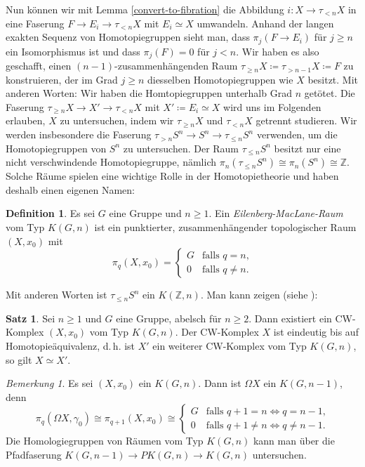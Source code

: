 \documentclass[11pt, a4paper, german]{article}
\theoremstyle{definition}
\newtheorem{satz}[lem]{Satz}
\newtheorem{defn}[lem]{Definition}
\theoremstyle{remark}
\newtheorem*{bem}{Bemerkung}
\newcommand{\Z}{\mathbb{Z}} %
\newcommand{\trunc}[2]{\tau_{#1} #2} %
\renewcommand{\dh}{d.\,h.} %
\begin{document}
Nun können wir mit Lemma \ref{convert-to-fibration} die Abbildung $i : X \to \trunc{< n}{X}$ in eine Faserung $F \to E_i \to \trunc{< n}{X}$ mit $E_i \simeq X$ umwandeln.
Anhand der langen exakten Sequenz von Homotopiegruppen sieht man, dass $\pi_j(F \to E_i)$ für $j \geq n$ ein Isomorphismus ist und dass $\pi_j(F) = 0$ für $j < n$.
Wir haben es also geschafft, einen $(n{-}1)$-zusammenhängenden Raum $\trunc{\geq n}{X} \coloneqq \trunc{> n-1}{X} \coloneqq F$ zu konstruieren, der im Grad $j \geq n$ diesselben Homotopiegruppen wie $X$ besitzt.
Mit anderen Worten: Wir haben die Homtopiegruppen unterhalb Grad $n$ getötet.
Die Faserung $\trunc{\geq n}{X} \to X' \to \trunc{< n}{X}$ mit $X' \coloneqq E_i \simeq X$ wird uns im Folgenden erlauben, $X$ zu untersuchen, indem wir $\trunc{\geq n}{X}$ und $\trunc{< n}{X}$ getrennt studieren.
Wir werden insbesondere die Faserung $\trunc{> n}{S^n} \to S^n \to \trunc{\leq n}{S^n}$ verwenden, um die Homotopiegruppen von $S^n$ zu untersuchen.
Der Raum $\trunc{\leq n}{S^n}$ besitzt nur eine nicht verschwindende Homotopiegruppe, nämlich $\pi_n(\trunc{\leq n}{S^n}) \cong \pi_n(S^n) \cong \Z$.
Solche Räume spielen eine wichtige Rolle in der Homotopietheorie und haben deshalb einen eigenen Namen:

\begin{defn}
  Es sei $G$ eine Gruppe und $n \geq 1$.
  Ein \emph{Eilenberg-MacLane-Raum} vom Typ $K(G, n)$ ist ein punktierter, zusammenhängender topologischer Raum $(X, x_0)$ mit
  \[
    \pi_q(X, x_0) = \begin{cases}
      G & \text{falls $q = n$,} \\
      0 & \text{falls $q \neq n$.}
    \end{cases}
  \]
\end{defn}

Mit anderen Worten ist $\trunc{\leq n}{S^n}$ ein $K(\Z, n)$.
Man kann zeigen (siehe \cite[365-366]{hatcher:at}):

\begin{satz}
  Sei $n \geq 1$ und $G$ eine Gruppe, abelsch für $n \geq 2$.
  Dann existiert ein CW-Komplex $(X, x_0)$ vom Typ $K(G, n)$.
  Der CW-Komplex $X$ ist eindeutig bis auf Homotopieäquivalenz, \dh{} ist $X'$ ein weiterer CW-Komplex vom Typ $K(G, n)$, so gilt $X \simeq X'$.
\end{satz}

\begin{bem}
  Es sei $(X, x_0)$ ein $K(G, n)$. Dann ist $\Omega X$ ein $K(G, n-1)$, denn
  \[
    \pi_q(\Omega X, \gamma_0) \cong
    \pi_{q+1}(X, x_0) \cong
    \begin{cases}
      G & \text{falls $q+1 = n \iff q = n-1$,} \\
      0 & \text{falls $q+1 \neq n \iff q \neq n-1$.}
    \end{cases}
  \]
  Die Homologiegruppen von Räumen vom Typ $K(G, n)$ kann man über die Pfadfaserung $K(G, n{-}1) \to P K(G, n) \to K(G, n)$ untersuchen.
\end{bem}
\end{document}
